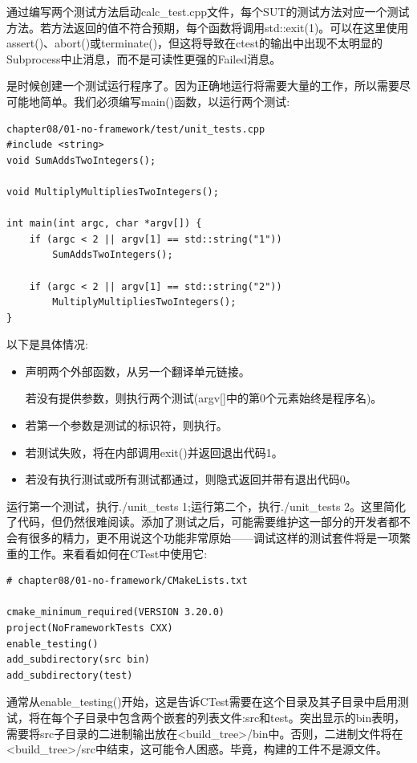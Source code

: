 通过编写两个测试方法启动calc\_test.cpp文件，每个SUT的测试方法对应一个测试方法。若方法返回的值不符合预期，每个函数将调用std::exit(1)。可以在这里使用assert()、abort()或terminate()，但这将导致在ctest的输出中出现不太明显的Subprocess中止消息，而不是可读性更强的Failed消息。

是时候创建一个测试运行程序了。因为正确地运行将需要大量的工作，所以需要尽可能地简单。我们必须编写main()函数，以运行两个测试:

\begin{lstlisting}[style=styleCXX]
chapter08/01-no-framework/test/unit_tests.cpp
#include <string>
void SumAddsTwoIntegers();

void MultiplyMultipliesTwoIntegers();

int main(int argc, char *argv[]) {
	if (argc < 2 || argv[1] == std::string("1"))
		SumAddsTwoIntegers();
	
	if (argc < 2 || argv[1] == std::string("2"))
		MultiplyMultipliesTwoIntegers();
}
\end{lstlisting} 

以下是具体情况:

\begin{itemize}
\item 
声明两个外部函数，从另一个翻译单元链接。

若没有提供参数，则执行两个测试(argv[]中的第0个元素始终是程序名)。

\item 
若第一个参数是测试的标识符，则执行。

\item 
若测试失败，将在内部调用exit()并返回退出代码1。

\item 
若没有执行测试或所有测试都通过，则隐式返回并带有退出代码0。
\end{itemize}

运行第一个测试，执行./unit\_tests 1;运行第二个，执行./unit\_tests 2。这里简化了代码，但仍然很难阅读。添加了测试之后，可能需要维护这一部分的开发者都不会有很多的精力，更不用说这个功能非常原始——调试这样的测试套件将是一项繁重的工作。来看看如何在CTest中使用它:

\begin{lstlisting}[style=styleCMake]
# chapter08/01-no-framework/CMakeLists.txt

cmake_minimum_required(VERSION 3.20.0)
project(NoFrameworkTests CXX)
enable_testing()
add_subdirectory(src bin)
add_subdirectory(test)
\end{lstlisting} 

通常从enable\_testing()开始，这是告诉CTest需要在这个目录及其子目录中启用测试，将在每个子目录中包含两个嵌套的列表文件:src和test。突出显示的bin表明，需要将src子目录的二进制输出放在<build\_tree>/bin中。否则，二进制文件将在<build\_tree>/src中结束，这可能令人困惑。毕竟，构建的工件不是源文件。

